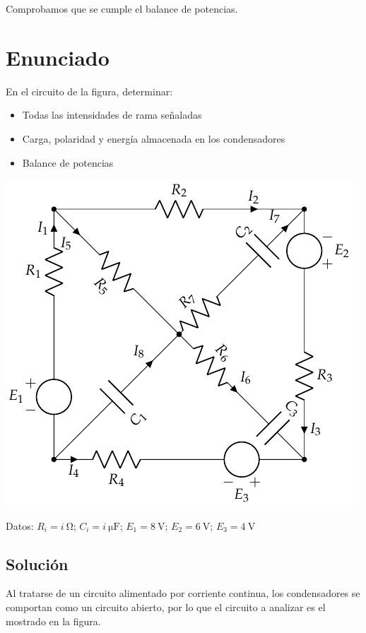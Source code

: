 Comprobamos que se cumple el balance de potencias.

\section{Enunciado}
En el circuito de la figura, determinar:
\begin{itemize}
\item Todas las intensidades de rama señaladas
\item Carga, polaridad y energía almacenada en los condensadores
\item Balance de potencias
\end{itemize}

\begin{center}
  \includegraphics{figuras/BT1_09.pdf}
\end{center}

  Datos: $R_i = \qty[parse-numbers=false]{i}{\ohm}$; $C_i = \qty[parse-numbers=false]{i}{\micro\farad}$; $E_1 = \qty{8}{\volt}$; $E_2 = \qty{6}{\volt}$; $E_3 = \qty{4}{\volt}$

\subsection*{Solución}
Al tratarse de un circuito alimentado por corriente continua, los
condensadores se comportan como un circuito abierto, por lo que el
circuito a analizar es el mostrado en la figura.

